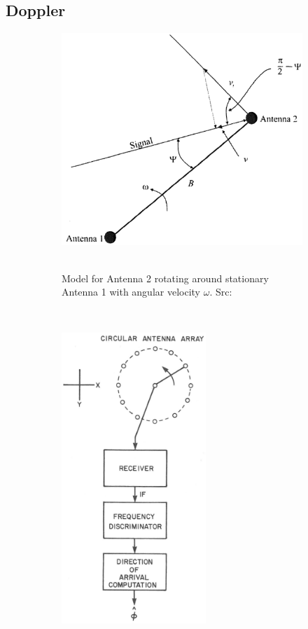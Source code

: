 \subsection{Doppler}

\begin{figure}
  \centering
  \begin{subfigure}[b]{0.48\textwidth}
    \centering
    \includegraphics[width=\textwidth]{./img/lit_review/doppler-2-antenna}
    ~ 
    \caption{Model for Antenna 2 rotating around stationary Antenna 1 with angular velocity \(\omega\). Src: \cite{poisel2012electronic}}
  \end{subfigure}
  ~
  \begin{subfigure}[b]{0.48\textwidth}
    \centering
    \includegraphics[width=0.6\textwidth]{./img/lit_review/doppler-switching}

\end{subfigure}
\end{figure}
